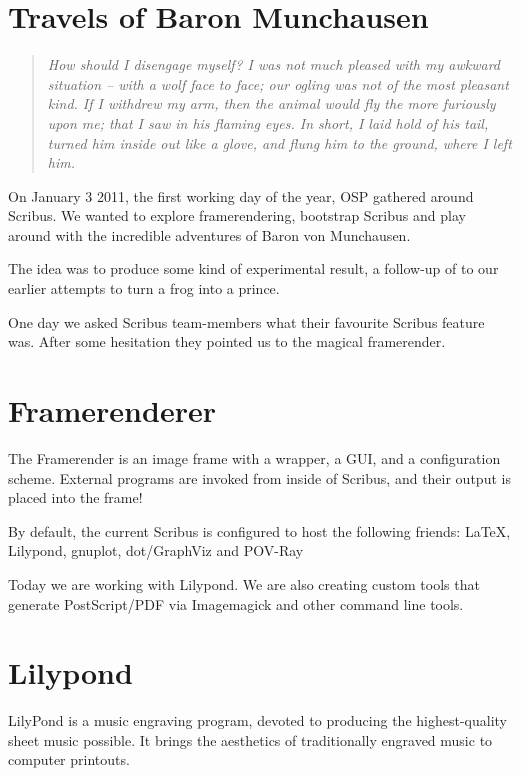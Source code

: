 \section*{Travels of Baron Munchausen}
\begin{quote}
\textit{How should I disengage myself? I was not much pleased with my awkward
situation -- with a wolf face to face; our ogling was not of the most pleasant
kind. If I withdrew my arm, then the animal would fly the more furiously upon
me; that I saw in his flaming eyes. In short, I laid hold of his tail, turned
him inside out like a glove, and flung him to the ground, where I left him.}
\end{quote}

On January 3 2011, the first working day of the year, OSP gathered around
Scribus. We wanted to explore framerendering, bootstrap Scribus and play
around with the incredible adventures of Baron von Munchausen.

The idea was to produce some kind of experimental result, a follow-up of to
our earlier attempts to turn a frog into a prince.

One day we asked Scribus team-members what their favourite Scribus feature
was. After some hesitation they pointed us to the magical framerender.

\section*{Framerenderer}
The Framerender is an image frame with a wrapper, a GUI, and a configuration
scheme. External programs are invoked from inside of Scribus, and their output
is placed into the frame!

By default, the current Scribus is configured to host the following friends:
LaTeX, Lilypond, gnuplot, dot/GraphViz and POV-Ray

Today we are working with Lilypond. We are also creating custom tools that
generate PostScript/PDF via Imagemagick and other command line tools.

\section*{Lilypond}
LilyPond is a music engraving program, devoted to producing the
highest-quality sheet music possible.  It brings the aesthetics of
traditionally engraved music to computer printouts.
